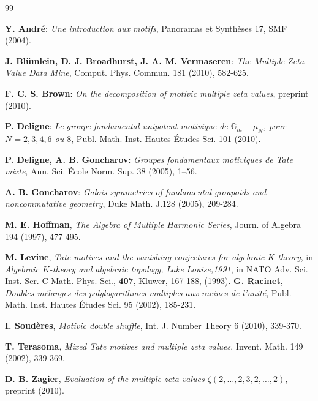\documentclass[10pt]{amsart}
\theoremstyle{definition}
\theoremstyle{remark}
\numberwithin{equation}{section}
\newcommand{\G}{\mathbb{G}}
\begin{document}
\begin{thebibliography}{99}

 {\bf Y. Andr\'e}: {\it Une introduction aux motifs}, Panoramas et Synth\`eses 17, SMF (2004).

  {\bf J. Bl\"umlein, D. J. Broadhurst, J. A. M. Vermaseren}: {\it The Multiple Zeta Value Data Mine}, Comput. Phys. Commun. 181  (2010), 582-625.

 {\bf F. C. S.  Brown}: {\it On the decomposition of motivic multiple zeta values}, preprint (2010).

 {\bf P. Deligne}: {\it Le groupe fondamental unipotent motivique de $\G_m - \mu_N$, pour  $N=2,3,4,6$ ou $8$},  Publ. Math. Inst. Hautes \'Etudes Sci. 101 (2010).

 {\bf P. Deligne, A. B. Goncharov}: {\it  Groupes fondamentaux motiviques de Tate mixte}, Ann. Sci. \'Ecole Norm. Sup.  38 (2005), 1--56. 


 {\bf A. B. Goncharov}: {\it Galois symmetries of fundamental groupoids and noncommutative geometry},  Duke Math. J.128 (2005), 209-284. 



 {\bf M. E. Hoffman}, {\it The Algebra of Multiple Harmonic Series}, Journ. of Algebra 194 
(1997), 477-495.

 {\bf M. Levine}, {\it  Tate motives and the vanishing conjectures for algebraic $K$-theory},  in {\it  Algebraic $K$-theory and algebraic topology, Lake Louise,1991}, in
NATO Adv. Sci. Inst. Ser. C Math. Phys. Sci., {\bf 407}, Kluwer,  167-188,
 (1993).
 {\bf G. Racinet}, {\it Doubles m\'elanges des polylogarithmes multiples aux racines de l'unit\'e},  Publ. Math. Inst. Hautes \'Etudes Sci.  95 (2002), 185-231.

 {\bf I. Soud\`eres}, {\it Motivic double shuffle}, Int. J. Number Theory 6 (2010),  339-370.


 {\bf T. Terasoma}, {\it Mixed Tate motives and multiple zeta values}, Invent. Math. 149 (2002), 339-369. 

 {\bf D. B. Zagier}, {\it Evaluation of the multiple zeta values $\zeta(2,\dots,2,3,2,\dots,2)$},
preprint (2010).


\end{thebibliography}
\end{document}
